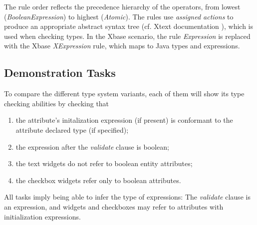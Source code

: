 The rule order reflects
the precedence hierarchy of the operators, from lowest
(\emph{BooleanExpression}) to highest (\emph{Atomic}). The rules use
\emph{assigned actions} to produce an appropriate abstract syntax tree (cf.
Xtext documentation \cite{xtextdoc}), which is used when checking types.
In the Xbase scenario, the rule \emph{Expression} is replaced with the Xbase
\emph{XExpression} rule, which maps to Java types and expressions.


\subsection{Demonstration Tasks}
To compare the different type system variants, each of them will show its type
checking abilities by checking that

\begin{enumerate}
\item the attribute's initalization expression (if present) is conformant to the
attribute declared type (if specified);
\item the expression after the \emph{validate} clause is boolean;
\item the text widgets do not refer to boolean entity attributes;
\item the checkbox widgets refer only to boolean attributes.
\end{enumerate}

All tasks imply being able to infer the type of expressions: The \emph{validate}
clause is an expression, and widgets and checkboxes may refer to
attributes with initialization expressions. 
